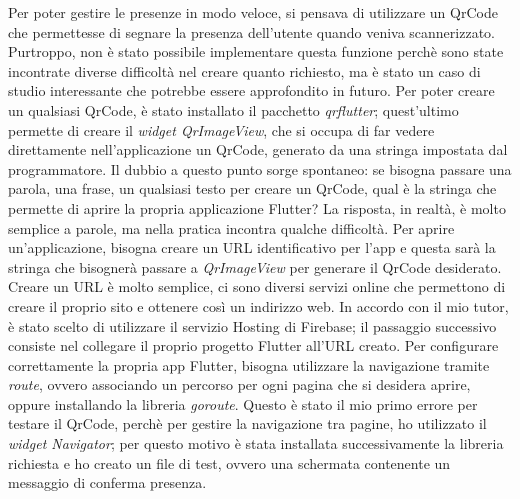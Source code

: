 Per poter gestire le presenze in modo veloce, si pensava di utilizzare un QrCode che permettesse di segnare la presenza dell'utente quando veniva scannerizzato.\newline
Purtroppo, non è stato possibile implementare questa funzione perchè sono state incontrate diverse difficoltà nel creare quanto richiesto, ma è stato un caso di studio interessante che potrebbe essere approfondito in futuro.\newline
\newline
Per poter creare un qualsiasi QrCode, è stato installato il pacchetto \emph{qr\textunderscore flutter}; quest'ultimo permette di creare il \emph{widget QrImageView}, che si occupa di far vedere direttamente nell'applicazione un QrCode, generato da una stringa impostata dal programmatore.\newline
Il dubbio a questo punto sorge spontaneo: se bisogna passare una parola, una frase, un qualsiasi testo per creare un QrCode, qual è la stringa che permette di aprire la propria applicazione Flutter?\newline
La risposta, in realtà, è molto semplice a parole, ma nella pratica incontra qualche difficoltà.\newline
Per aprire un'applicazione, bisogna creare un URL identificativo per l'app e questa sarà la stringa che bisognerà passare a \emph{QrImageView} per generare il QrCode desiderato.\newline
\newline
Creare un URL è molto semplice, ci sono diversi servizi online che permettono di creare il proprio sito e ottenere così un indirizzo web.\newline
In accordo con il mio tutor, è stato scelto di utilizzare il servizio Hosting di Firebase; il passaggio successivo consiste nel collegare il proprio progetto Flutter all'URL creato.\newline
\newline
Per configurare correttamente la propria app Flutter, bisogna utilizzare la navigazione tramite \emph{route}, ovvero associando un percorso per ogni pagina che si desidera aprire, oppure installando la libreria \emph{go\textunderscore route}.\newline
Questo è stato il mio primo errore per testare il QrCode, perchè per gestire la navigazione tra pagine, ho utilizzato il \emph{widget Navigator}; per questo motivo è stata installata successivamente la libreria richiesta e ho creato un file di test, ovvero una schermata contenente un messaggio di conferma presenza.\newline
